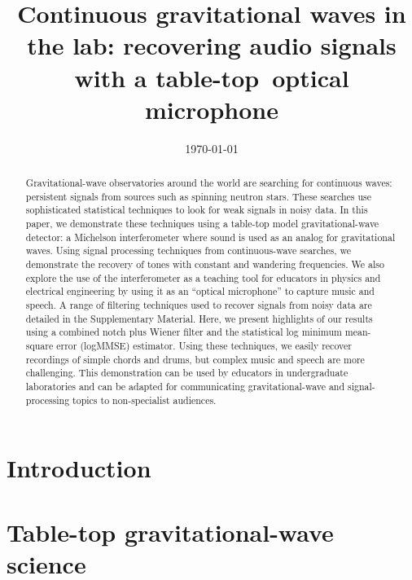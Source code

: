 \documentclass[aps,pra,superscriptaddress,reprint]{revtex4-2}
\begin{document}
\title{Continuous gravitational waves in the lab: recovering audio signals with a table-top~optical microphone}



\date{\today}


\begin{abstract}
Gravitational-wave observatories around the world are searching for continuous waves: persistent signals from sources such as spinning neutron stars. 
These searches use sophisticated statistical techniques to look for weak signals in noisy data. 
In this paper, we demonstrate these techniques using a table-top model gravitational-wave detector: a Michelson interferometer where sound is used as an analog for gravitational waves. 
Using signal processing techniques from continuous-wave searches, we demonstrate the recovery of tones with constant and wandering frequencies. 
We also explore the use of the interferometer as a teaching tool for educators in physics and electrical engineering by using it as an ``optical microphone'' to capture music and speech. 
A range of filtering techniques used to recover signals from noisy data are detailed in the Supplementary Material. 
Here, we present highlights of our results using a combined notch plus Wiener filter and the statistical log minimum mean-square error (logMMSE) estimator. 
Using these techniques, we easily recover recordings of simple chords and drums, but complex music and speech are more challenging.
This demonstration can be used by educators in undergraduate laboratories and can be adapted for communicating gravitational-wave and signal-processing topics to non-specialist audiences.  
\end{abstract}



\maketitle

\section{Introduction}
\label{sec:introduction}



\section{Table-top gravitational-wave science}
\label{sec:ifo}

\end{document}
